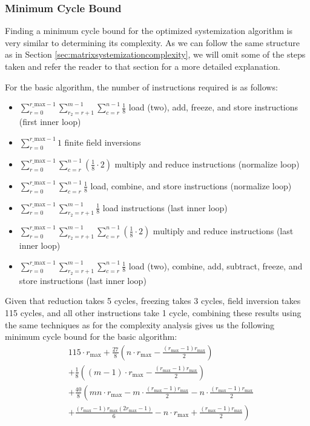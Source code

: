 \documentclass[11pt,a4paper]{report}
\theoremstyle{definition}
\begin{document}
\subsubsection{Minimum Cycle Bound}
Finding a minimum cycle bound for the optimized systemization algorithm is very similar to determining its complexity. As we can follow the same structure as in Section \ref{sec:matrixsystemizationcomplexity}, we will omit some of the steps taken and refer the reader to that section for a more detailed explanation.

For the basic algorithm, the number of instructions required is as follows:
\begin{itemize}
  \item $\sum_{r=0}^{r\_\text{max}-1} \sum_{r_2=r+1}^{m-1} \sum_{c=r}^{n-1} \frac{1}{8}$ load (two), add, freeze, and store instructions (first inner loop)
  \item $\sum_{r=0}^{r\_\text{max}-1} 1$ finite field inversions
  \item $\sum_{r=0}^{r\_\text{max}-1} \sum_{c=r}^{n-1} (\frac{1}{8} \cdot 2)$ multiply and reduce instructions (normalize loop)
  \item $\sum_{r=0}^{r\_\text{max}-1} \sum_{c=r}^{n-1} \frac{1}{8}$ load, combine, and store instructions (normalize loop)
  \item $\sum_{r=0}^{r\_\text{max}-1} \sum_{r_2=r+1}^{m-1} \frac{1}{8}$ load instructions (last inner loop)
  \item $\sum_{r=0}^{r\_\text{max}-1} \sum_{r_2=r+1}^{m-1} \sum_{c=r}^{n-1} (\frac{1}{8} \cdot 2)$ multiply and reduce instructions (last inner loop)
  \item $\sum_{r=0}^{r\_\text{max}-1} \sum_{r_2=r+1}^{m-1} \sum_{c=r}^{n-1} \frac{1}{8}$ load (two), combine, add, subtract, freeze, and store instructions (last inner loop)
\end{itemize}
Given that reduction takes 5 cycles, freezing takes 3 cycles, field inversion takes 115 cycles, and all other instructions take 1 cycle, combining these results using the same techniques as for the complexity analysis gives us the following minimum cycle bound for the basic algorithm:
\begin{align*}
  & 115 \cdot r_\text{max} + \frac{27}{8} \left( n \cdot r_\text{max} - \frac{(r_\text{max} - 1)r_{\text{max}}}{2} \right)\\
  & + \frac{1}{8} \left( (m-1) \cdot r_\text{max} - \frac{(r_\text{max} - 1)r_{\text{max}}}{2} \right) \\
  & + \frac{40}{8} \left( mn \cdot r_\text{max} - m \cdot \frac{(r_\text{max} - 1)r_{\text{max}}}{2} - n \cdot \frac{(r_\text{max} - 1)r_{\text{max}}}{2} \right. \\
  & \left. + \frac{(r_\text{max} - 1)r_{\text{max}}(2r_{\text{max}} - 1)}{6} - n \cdot r_\text{max} + \frac{(r_\text{max} - 1)r_{\text{max}}}{2} \right)
\end{align*}
\end{document}
